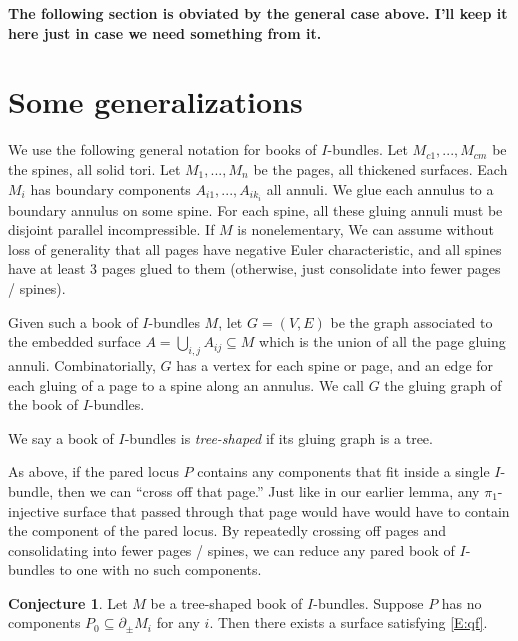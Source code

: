 \documentclass[12pt]{amsart}
\theoremstyle{definition}
\newtheorem{conj}[theorem]{Conjecture}
\theoremstyle{remark}
\newcommand{\bd}{\partial}
\newcommand{\cin}{\subseteq}
\begin{document}
{\bf The following section is obviated by the general case above. I'll keep it
here just in case we need something from it. }

{\tiny

\section{Some generalizations}

We use the following general notation for books of $I$-bundles. Let
$M_{c1},...,M_{cm}$ be the spines, all solid tori. Let $M_1,...,M_n$ be the
pages, all thickened surfaces. Each $M_i$ has boundary components
$A_{i1},...,A_{ik_i}$ all annuli. We glue each annulus to a boundary annulus on
some spine. For each spine, all these gluing annuli must be disjoint parallel
incompressible. If $M$ is nonelementary, We can assume without loss of
generality that all pages have negative Euler characteristic, and all spines
have at least 3 pages glued to them (otherwise, just consolidate into fewer
pages / spines).

Given such a book of $I$-bundles $M$, let $G=(V,E)$ be the graph associated to
the embedded surface $A = \bigcup_{i,j} A_{ij} \cin M$ which is the union of
all the page gluing annuli. Combinatorially, $G$ has a vertex for each spine or
page, and an edge for each gluing of a page to a spine along an annulus. We
call $G$ the gluing graph of the book of $I$-bundles.

We say a book of $I$-bundles is \emph{tree-shaped} if its gluing graph is
a tree.

As above, if the pared locus $P$ contains any components that fit inside
a single $I$-bundle, then we can ``cross off that page.'' Just like in our
earlier lemma, any $\pi_1$-injective surface that passed through that page
would have would have to contain the component of the pared locus. By
repeatedly crossing off pages and consolidating into fewer pages / spines, we
can reduce any pared book of $I$-bundles to one with no such components.

\begin{conj}

Let $M$ be a tree-shaped book of $I$-bundles. Suppose $P$ has no components
$P_0\cin \bd_\pm M_i$ for any $i$. Then there exists a surface satisfying
\eqref{E:qf}.

\end{conj}

}
\end{document}
